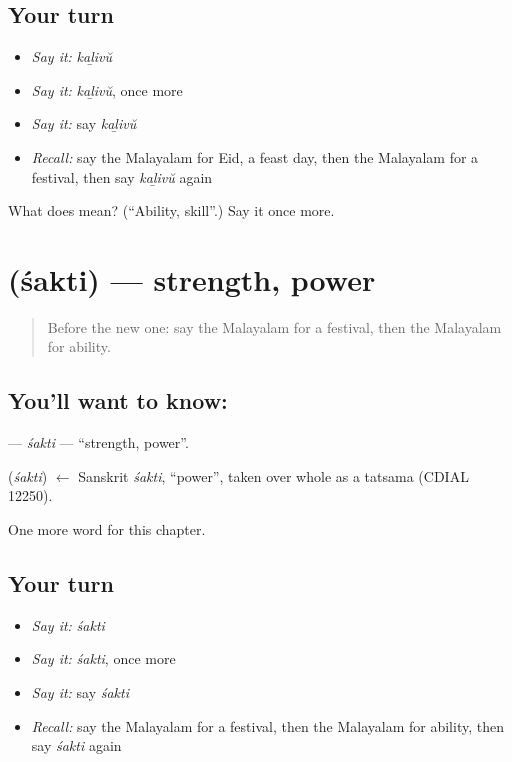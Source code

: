 \subsection*{Your turn}
\begin{itemize}
\raggedright
  \item \emph{Say it:} \emph{kaḻivŭ}
  \item \emph{Say it:} \emph{kaḻivŭ}, once more
  \item \emph{Say it:} say \emph{kaḻivŭ}
  \item \emph{Recall:} say the Malayalam for Eid, a feast day, then the Malayalam for a festival, then say \emph{kaḻivŭ} again
\end{itemize}

\begin{tcolorbox}[breakable,colback=teal!4,colframe=teal!35!black,title={Before you move on}]
What does  mean? (\textquotedblleft{}Ability, skill\textquotedblright{}.) Say it once more.
\end{tcolorbox}
\section[\texorpdfstring{\ml{ശക്തി} (śakti)}{ശക്തി (śakti)}]{ (śakti) — strength, power}

\label{lesson:ML-C142-sakti}



\begin{quote}
Before the new one: say the Malayalam for a festival, then the Malayalam for ability.
\end{quote}

\subsection*{You'll want to know: }
\textbf{} — \emph{śakti} — \textquotedblleft{}strength, power\textquotedblright{}.

\begin{cousinweb}
\textbf{} (\emph{śakti}) $\leftarrow$ Sanskrit \emph{śakti}, \textquotedblleft{}power\textquotedblright{}, taken over whole as a tatsama (CDIAL 12250).
\end{cousinweb}

\begin{grammarlens}[title={What you've built}]
One more word for this chapter.
\end{grammarlens}

\subsection*{Your turn}
\begin{itemize}
\raggedright
  \item \emph{Say it:} \emph{śakti}
  \item \emph{Say it:} \emph{śakti}, once more
  \item \emph{Say it:} say \emph{śakti}
  \item \emph{Recall:} say the Malayalam for a festival, then the Malayalam for ability, then say \emph{śakti} again
\end{itemize}

